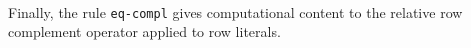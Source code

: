 \documentclass[authoryear, acmsmall, screen, review, nonacm]{acmart}
\begin{document}
\begin{code}
\AgdaSpace{}%
\AgdaSpace{}%
\AgdaSymbol{\}}\AgdaSpace{}%
\AgdaSymbol{\{}\AgdaSpace{}%
\AgdaSymbol{:}\AgdaSpace{}%
\AgdaSpace{}%
\AgdaSymbol{(}\AgdaSpace{}%
\AgdaSymbol{)\}}\AgdaSpace{}%
\<%
\\
\>[4][@{}l@{\AgdaIndent{0}}]%
\>[8]\AgdaSymbol{(}\AgdaSpace{}%
\AgdaSymbol{\{}\AgdaSpace{}%
\AgdaSymbol{=}\AgdaSpace{}%
\AgdaSymbol{\}}\AgdaSpace{}%
\AgdaSpace{}%
\AgdaSymbol{)}\AgdaSpace{}%
\AgdaSpace{}%
\AgdaSpace{}%
\AgdaSpace{}%
\AgdaSpace{}%
\AgdaSymbol{\{}\AgdaSpace{}%
\AgdaSymbol{=}\AgdaSpace{}%
\AgdaSymbol{\}}\AgdaSpace{}%
\AgdaSpace{}%
\AgdaSymbol{(}\AgdaSpace{}%
\AgdaSpace{}%
\AgdaSymbol{)}\<%
\end{code}

\Ni Finally, the rule \verb!eq-compl! gives computational content to the relative row complement operator applied to row literals.
\end{document}
